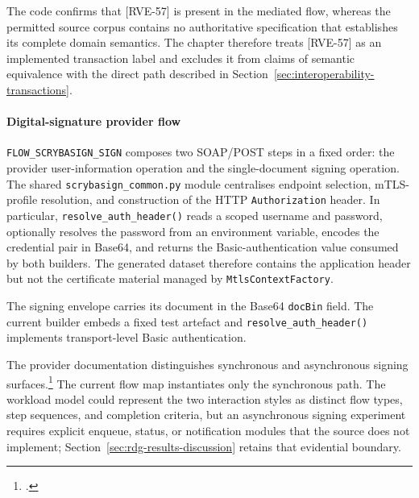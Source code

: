 \noindent The code confirms that [RVE-57] is present in the mediated flow, whereas the
permitted source corpus contains no authoritative specification that establishes
its complete domain semantics. The chapter therefore treats [RVE-57] as an
implemented transaction label and excludes it from claims of semantic
equivalence with the direct path described in
Section~\ref{sec:interoperability-transactions}.

\paragraph{Digital-signature provider flow}
\noindent \texttt{FLOW\_SCRYBASIGN\_SIGN} composes two SOAP/POST steps in a fixed order:
the provider user-information operation and the single-document signing
operation. The shared \texttt{scrybasign\_common.py} module centralises endpoint
selection, mTLS-profile resolution, and construction of the HTTP \texttt{Authorization} header. In particular, \texttt{resolve\_auth\_header()}
reads a scoped username and password, optionally resolves the password from an
environment variable, encodes the credential pair in Base64, and returns the
Basic-authentication value consumed by both builders. The generated dataset
therefore contains the application header but not the certificate material
managed by \texttt{MtlsContextFactory}.

\noindent The signing envelope carries its document in the Base64 \texttt{docBin} field.
The current builder embeds a fixed test artefact and \texttt{resolve\_auth\_header()} implements transport-level Basic authentication.

\noindent The provider documentation distinguishes synchronous and asynchronous signing
surfaces.\footcite{scryba-sign-developer-guide-v16} The current flow map instantiates only the synchronous path.
The workload model could represent the two interaction
styles as distinct flow types, step sequences, and completion criteria, but an
asynchronous signing experiment requires explicit enqueue, status, or
notification modules that the source does not implement; Section~\ref{sec:rdg-results-discussion} retains that evidential boundary.

